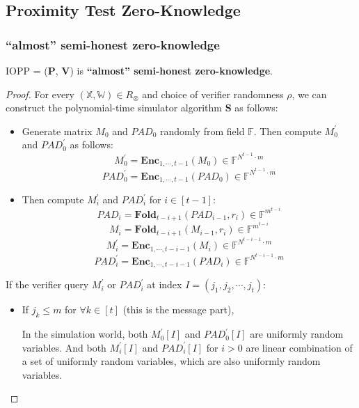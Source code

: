 \subsection{Proximity Test Zero-Knowledge}

\subsubsection{``almost'' semi-honest zero-knowledge}

\begin{lemma}
\label{lemma:szkpc-zk}

IOPP = ($\textbf{P}$, $\textbf{V}$) is \textbf{``almost'' semi-honest zero-knowledge}.

\end{lemma}
\begin{proof}

For every $(\mathbb{X}, \mathbb{W}) \in R_\otimes$ and choice of verifier randomness $\rho$, we can construct the polynomial-time simulator algorithm $\textbf{S}$ as follows:


\begin{itemize}
    \item Generate matrix $M_0$ and $PAD_0$ randomly from field $\mathbb{F}$. Then compute $M_0^\prime$ and $PAD_0^\prime$ as follows:
    $$
        M_0^{\prime} = \textbf{Enc}_{1,\cdots,t-1}(M_0) \in \mathbb{F}^{N^{t-1} \cdot m}
    $$
    $$
        PAD_0^{\prime} = \textbf{Enc}_{1,\cdots,t-1}(PAD_0) \in \mathbb{F}^{N^{t-1} \cdot m}
    $$
    \item Then compute $M_i^{\prime}$ and $PAD_i^\prime$ for $i \in [t-1]$:
    $$
        PAD_i = \textbf{Fold}_{t-i+1}(PAD_{i-1}, r_i) \in \mathbb{F}^{m^{t-i}}
    $$
    $$
        M_i = \textbf{Fold}_{t-i+1}(M_{i-1}, r_i) \in \mathbb{F}^{m^{t-i}}
    $$
    $$
        M_i^\prime =  \textbf{Enc}_{1, \cdots, t- i - 1}(M_i) \in \mathbb{F}^{N^{t-i-1} \cdot m}
    $$
    $$
        PAD_i^\prime =  \textbf{Enc}_{1, \cdots, t- i - 1}(PAD_i) \in \mathbb{F}^{N^{t-i-1} \cdot m}
    $$
\end{itemize}

If the verifier query $M_i^{\prime}$ or $PAD_i^\prime$ at index $I = (j_1, j_2, \cdots, j_t)$:

\begin{itemize}
    \item If $j_k \le m$ for $\forall k \in [t]$ (this is the message part),
    
    In the simulation world, both $M_0^\prime[I]$ and $PAD_0^\prime[I]$ are uniformly random variables. And both $M_i^\prime[I]$ and $PAD_i^\prime[I]$ for $i > 0$ are linear combination of a set of uniformly random variables, which are also uniformly random variables.
    

\end{itemize}
\end{proof}
